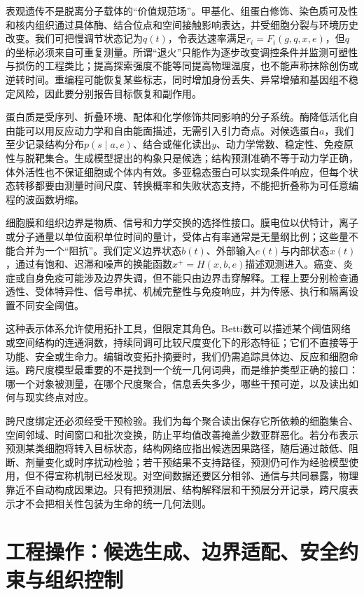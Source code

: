 表观遗传不是脱离分子载体的“价值规范场”。甲基化、组蛋白修饰、染色质可及性和核内组织通过具体酶、结合位点和空间接触影响表达，并受细胞分裂与环境历史改变。我们可把慢调节状态记为$q(t)$，令表达速率满足$r_i=F_i(g,q,x,e)$，但$q$的坐标必须来自可重复测量。所谓“退火”只能作为逐步改变调控条件并监测可塑性与损伤的工程类比；提高探索强度不能等同提高物理温度，也不能声称抹除创伤或逆转时间。重编程可能恢复某些标志，同时增加身份丢失、异常增殖和基因组不稳定风险，因此要分别报告目标恢复和副作用。

蛋白质是受序列、折叠环境、配体和化学修饰共同影响的分子系统。酶降低活化自由能可以用反应动力学和自由能面描述，无需引入引力奇点。对候选蛋白$a$，我们至少记录结构分布$p(s\mid a,e)$、结合或催化读出$y$、动力学常数、稳定性、免疫原性与脱靶集合。生成模型提出的构象只是候选；结构预测准确不等于动力学正确，体外活性也不保证细胞或个体内有效。多亚稳态蛋白可以实现条件响应，但每个状态转移都要由测量时间尺度、转换概率和失败状态支持，不能把折叠称为可任意编程的波函数坍缩。

细胞膜和组织边界是物质、信号和力学交换的选择性接口。膜电位以伏特计，离子或分子通量以单位面积单位时间的量计，受体占有率通常是无量纲比例；这些量不能合并为一个“阻抗”。我们定义边界状态$b(t)$、外部输入$e(t)$与内部状态$x(t)$，通过有饱和、迟滞和噪声的换能函数$x^+=H(x,b,e)$描述观测进入。癌变、炎症或自身免疫可能涉及边界失调，但不能只由边界击穿解释。工程上要分别检查通透性、受体特异性、信号串扰、机械完整性与免疫响应，并为传感、执行和隔离设置不同安全阈值。

这种表示体系允许使用拓扑工具，但限定其角色。Betti数可以描述某个阈值网络或空间结构的连通洞数，持续同调可比较尺度变化下的形态特征；它们不直接等于功能、安全或生命力。编辑改变拓扑摘要时，我们仍需追踪具体边、反应和细胞命运。跨尺度模型最重要的不是找到一个统一几何词典，而是维护类型正确的接口：哪一个对象被测量，在哪个尺度聚合，信息丢失多少，哪些干预可逆，以及读出如何与现实终点对应。

跨尺度绑定还必须经受干预检验。我们为每个聚合读出保存它所依赖的细胞集合、空间邻域、时间窗口和批次变换，防止平均值改善掩盖少数亚群恶化。若分布表示预测某类细胞将转入目标状态，结构网络应指出候选因果路径，随后通过敲低、阻断、剂量变化或时序扰动检验；若干预结果不支持路径，预测仍可作为经验模型使用，但不得宣称机制已经发现。对空间数据还要区分相邻、通信与共同暴露，物理靠近不自动构成因果边。只有把预测层、结构解释层和干预层分开记录，跨尺度表示才不会把相关性包装为生命的统一几何法则。

\section{工程操作：候选生成、边界适配、安全约束与组织控制}
\label{sec:tb_engineering_laws}

